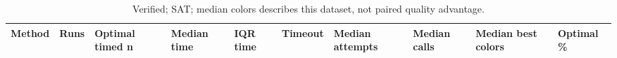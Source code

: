 \begin{table}[htbp]
\centering
\caption{Verified; SAT; median colors describes this dataset, not paired quality advantage.}
\label{tab:p2a-SAT-methods}
\begin{tabular}{llllllllll}
\hline
Method & Runs & Optimal timed n & Median time & IQR time & Timeout & Median attempts & Median calls & Median best colors & Optimal \% \\
\hline
\hline
\end{tabular}
\end{table}
